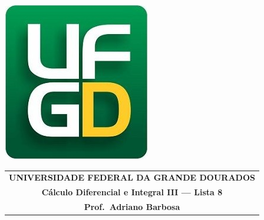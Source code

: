 \documentclass[a4paper,5pt]{amsbook}
\begin{document}
\thispagestyle{empty}
\pagestyle{empty}
\begin{minipage}[h]{0.14\textwidth}
	\includegraphics[scale=0.24]{../../ufgd.png}
\end{minipage}
\begin{minipage}[h]{\textwidth}
\begin{tabular}{c}
{{\bf UNIVERSIDADE FEDERAL DA GRANDE DOURADOS}}\\
{{\bf C\'alculo Diferencial e Integral III --- Lista 8}}\\
{{\bf Prof.\ Adriano Barbosa}}\\
\end{tabular}
\vspace{-0.45cm}
%
\end{minipage}

\end{document}
